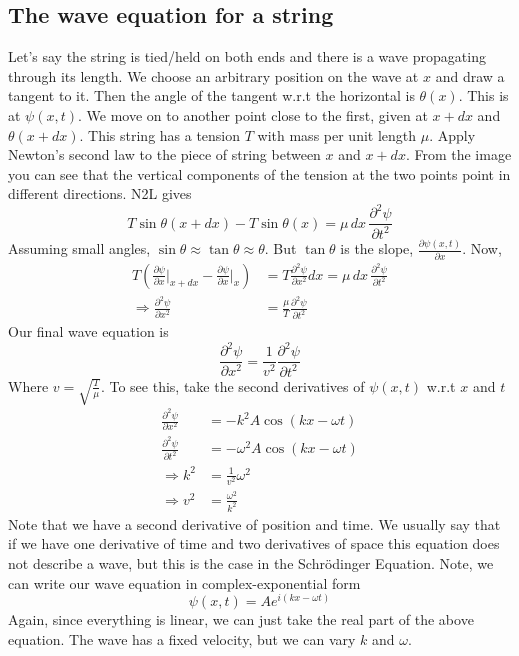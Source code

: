 \documentclass{report}
\numberwithin{equation}{section}
\begin{document}
\subsection{The wave equation for a string}
Let's say the string is tied/held on both ends and there is a wave propagating through its length. We choose an arbitrary position on the wave at $x$ and draw a tangent to it. Then the angle of the tangent w.r.t the horizontal is $\theta(x)$. This is at $\psi(x,t)$. We move on to another point close to the first, given at $x+dx$ and $\theta(x+dx)$. This string has a tension $T$ with mass per unit length $\mu$. Apply Newton's second law to the piece of string between $x$ and $x+dx$. From the image you can see that the vertical components of the tension at the two points point in different directions. N2L gives
\begin{equation*}
	T\sin\theta(x + dx) - T\sin\theta(x) = \mu \,dx\,\frac{\partial^2\psi}{\partial t^2}
\end{equation*}
Assuming small angles, $\sin\theta \approx \tan\theta \approx \theta$. But $\tan\theta$ is the slope, $\frac{\partial \psi(x,t)}{\partial x}$. Now,
\begin{align*}
	T\left(\frac{\partial \psi}{\partial x}\bigg|_{x+dx} - \frac{\partial \psi}{\partial x}\bigg|_{x}\right) &= T\frac{\partial^2\psi}{\partial x^2}dx = \mu\, dx\,\frac{\partial ^2 \psi}{\partial t^2}\\
	\Rightarrow \frac{\partial^2\psi}{\partial x^2} &= \frac{\mu}{T}\frac{\partial ^2\psi}{\partial t^2}
\end{align*}
Our final wave equation is
\begin{equation}
	\frac{\partial^2\psi}{\partial x^2} = \frac{1}{v^2}\frac{\partial^2\psi}{\partial t^2}
\end{equation}
Where $v= \sqrt{\frac{T}{\mu}}$. To see this, take the second derivatives of $\psi(x,t)$ w.r.t $x$ and $t$
\begin{align*}
	\frac{\partial^2\psi}{\partial x^2} &= -k^2A\cos(kx-\omega t)\\
	\frac{\partial^2\psi}{\partial t^2} &= -\omega^2 A\cos(kx - \omega t)\\
	\Rightarrow k^2 &= \frac{1}{v^2}\omega^2 \\
	\Rightarrow v^2 &= \frac{\omega^2}{k^2}
\end{align*}
Note that we have a second derivative of position and time. We usually say that if we have one derivative of time and two derivatives of space this equation does not describe a wave, but this is the case in the Schr\"odinger Equation. Note, we can write our wave equation in complex-exponential form
\begin{equation}
	\psi(x,t) = Ae^{i(kx-\omega t)}
\end{equation}
Again, since everything is linear, we can just take the real part of the above equation. The wave has a fixed velocity, but we can vary $k$ and $\omega$.
\end{document}
